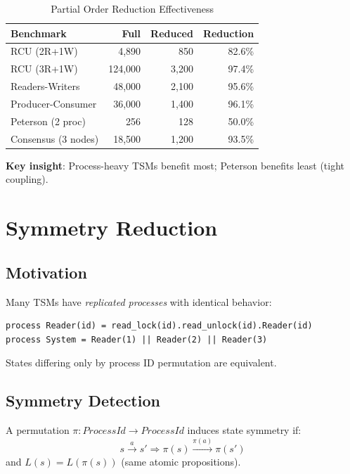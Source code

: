 \documentclass[conference]{IEEEtran}
\begin{document}
\begin{table}[h]
\centering
\caption{Partial Order Reduction Effectiveness}
\label{tab:por_results}
\begin{tabular}{lrrr}
\toprule
\textbf{Benchmark} & \textbf{Full} & \textbf{Reduced} & \textbf{Reduction} \\
\midrule
RCU (2R+1W) & 4,890 & 850 & 82.6\% \\
RCU (3R+1W) & 124,000 & 3,200 & 97.4\% \\
Readers-Writers & 48,000 & 2,100 & 95.6\% \\
Producer-Consumer & 36,000 & 1,400 & 96.1\% \\
Peterson (2 proc) & 256 & 128 & 50.0\% \\
Consensus (3 nodes) & 18,500 & 1,200 & 93.5\% \\
\bottomrule
\end{tabular}
\end{table}

\textbf{Key insight}: Process-heavy TSMs benefit most; Peterson benefits least (tight coupling).

\section{Symmetry Reduction}
\label{sec:symmetry}

\subsection{Motivation}

Many TSMs have \textit{replicated processes} with identical behavior:

\begin{lstlisting}
process Reader(id) = read_lock(id).read_unlock(id).Reader(id)
process System = Reader(1) || Reader(2) || Reader(3)
\end{lstlisting}

States differing only by process ID permutation are equivalent.

\subsection{Symmetry Detection}

\begin{definition}
A permutation $\pi: ProcessId \to ProcessId$ induces state symmetry if:
\begin{equation}
s \xrightarrow{a} s' \Rightarrow \pi(s) \xrightarrow{\pi(a)} \pi(s')
\end{equation}
and $L(s) = L(\pi(s))$ (same atomic propositions).
\end{definition}
\end{document}

